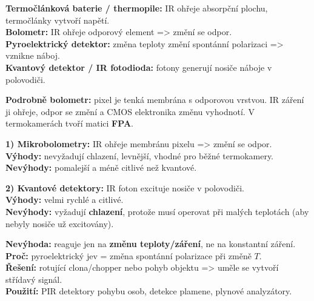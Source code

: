 \documentclass[12pt]{article}
\newcounter{chapternumber}
\newcounter{questionnumber}
\renewcommand{\thequestionnumber}{\arabic{chapternumber}.\arabic{questionnumber}}
\begin{document}
\begin{tcolorbox}[title={\stepcounter{questionnumber}\thequestionnumber. Jaké znáte senzory infračerveného záření (vyjmenujte, jeden popište podrobněji). (21–28)}]
\textbf{Termočlánková baterie / thermopile:} IR ohřeje absorpční plochu, termočlánky vytvoří napětí.\\
\textbf{Bolometr:} IR ohřeje odporový element => změní se odpor.\\
\textbf{Pyroelektrický detektor:} změna teploty změní spontánní polarizaci => vznikne náboj.\\
\textbf{Kvantový detektor / IR fotodioda:} fotony generují nosiče náboje v polovodiči.

\textbf{Podrobně bolometr:} pixel je tenká membrána s odporovou vrstvou. IR záření ji ohřeje, odpor se změní a CMOS elektronika změnu vyhodnotí. V termokamerách tvoří matici \textbf{FPA}.
\end{tcolorbox}

\begin{tcolorbox}[title={\stepcounter{questionnumber}\thequestionnumber. Uveďte dva základní principy, na kterých pracují pixelové senzory moderních pyrokamer s velkým rozlišením. Jaké jsou jejich hlavní výhody a nevýhody? U kterého z nich se používá chlazení senzoru a proč? (24–28)}]
\textbf{1) Mikrobolometry:} IR ohřeje membránu pixelu => změní se odpor.\\
\textbf{Výhody:} nevyžadují chlazení, levnější, vhodné pro běžné termokamery.\\
\textbf{Nevýhody:} pomalejší a méně citlivé než kvantové.

\textbf{2) Kvantové detektory:} IR foton excituje nosiče v polovodiči.\\
\textbf{Výhody:} velmi rychlé a citlivé.\\
\textbf{Nevýhody:} vyžadují \textbf{chlazení}, protože musí operovat při malých teplotách (aby nebyly nosiče už excitovány).
\end{tcolorbox}

\begin{tcolorbox}[title={\stepcounter{questionnumber}\thequestionnumber. Jaká je základní nevýhoda pyroelektrického senzoru teploty a proč a kde se vůbec používá? (26–27)}]
\textbf{Nevýhoda:} reaguje jen na \textbf{změnu teploty/záření}, ne na konstantní záření.\\
\textbf{Proč:} pyroelektrický jev = změna spontánní polarizace při změně $T$.\\
\textbf{Řešení:} rotující clona/chopper nebo pohyb objektu => uměle se vytvoří střídavý signál.\\
\textbf{Použití:} PIR detektory pohybu osob, detekce plamene, plynové analyzátory.
\end{tcolorbox}
\end{document}
